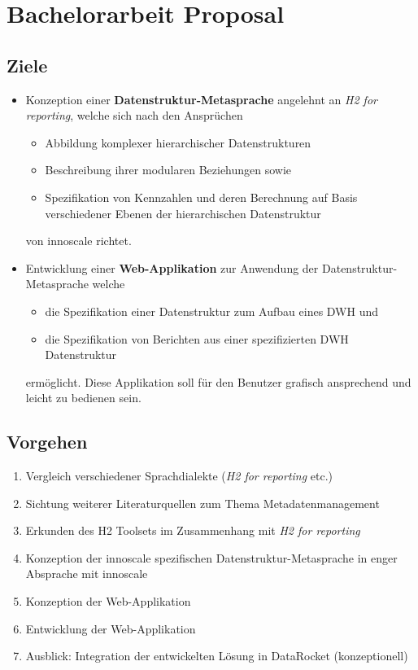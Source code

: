 \chapter{Bachelorarbeit Proposal}


\section{Ziele}
\begin{itemize}
  \item Konzeption einer \textbf{Datenstruktur-Metasprache} angelehnt an
    \textit{H2 for reporting}, welche sich nach den Ansprüchen 
    \begin{itemize}
      \item Abbildung komplexer hierarchischer Datenstrukturen
      \item Beschreibung ihrer modularen Beziehungen sowie
      \item Spezifikation von Kennzahlen und deren Berechnung auf Basis
        verschiedener Ebenen der hierarchischen Datenstruktur
    \end{itemize}
    von innoscale richtet.
  \item Entwicklung einer \textbf{Web-Applikation} zur Anwendung der
    Datenstruktur-Metasprache welche
    \begin{itemize}
      \item die Spezifikation einer Datenstruktur zum Aufbau eines \acrshort{DWH} und
      \item die Spezifikation von Berichten aus einer spezifizierten
        \acrshort{DWH} Datenstruktur
    \end{itemize}
    ermöglicht. Diese Applikation soll für den Benutzer grafisch ansprechend
    und leicht zu bedienen sein.
\end{itemize}


\section{Vorgehen}
\begin{enumerate}
  \item Vergleich verschiedener Sprachdialekte (\textit{H2 for reporting} etc.)
  \item Sichtung weiterer Literaturquellen zum Thema Metadatenmanagement
  \item Erkunden des H2 Toolsets im Zusammenhang mit \textit{H2 for
    reporting}
  \item Konzeption der innoscale spezifischen Datenstruktur-Metasprache in
    enger Absprache mit innoscale
  \item Konzeption der Web-Applikation
  \item Entwicklung der Web-Applikation
  \item Ausblick: Integration der entwickelten Lösung in DataRocket
    (konzeptionell)
\end{enumerate}

